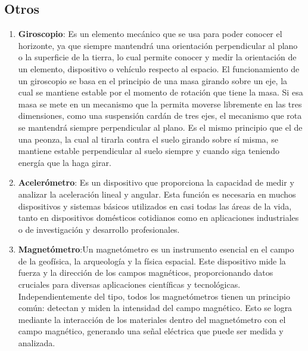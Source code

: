 	\subsection{Otros}
		\begin{enumerate}
		\item \textbf{Giroscopio}: Es un elemento mecánico que se usa para poder conocer el horizonte, ya que siempre mantendrá una orientación perpendicular al plano o la superficie de la tierra, lo cual permite conocer y medir la orientación de un elemento, dispositivo o vehículo respecto al espacio.
		El funcionamiento de un giroscopio se basa en el principio de una masa girando sobre un eje, la cual se mantiene estable por el momento de rotación que tiene la masa. Si esa masa se mete en un mecanismo que la permita moverse libremente en las tres dimensiones, como una suspensión cardán de tres ejes, el mecanismo que rota se mantendrá siempre perpendicular al plano. Es el mismo principio que el de una peonza, la cual al tirarla contra el suelo girando sobre sí misma, se mantiene estable perpendicular al suelo siempre y cuando siga teniendo energía que la haga girar. \cite{Giroscopio}
		
		\begin{figure}[h]
			\centering
			\hfill
		\end{figure}	
		
		\item \textbf{Acelerómetro}: Es un dispositivo que proporciona la capacidad de medir y analizar la aceleración lineal y angular. Esta función es necesaria en muchos dispositivos y sistemas básicos utilizados en casi todas las áreas de la vida, tanto en dispositivos domésticos cotidianos como en aplicaciones industriales o de investigación y desarrollo profesionales. \cite{Acelerómetro}
		
		\begin{figure}[h]
			\centering
			\hfill
		\end{figure}	
			
		\item \textbf{Magnetómetro}:Un magnetómetro es un instrumento esencial en el campo de la geofísica, la arqueología y la física espacial. Este dispositivo mide la fuerza y la dirección de los campos magnéticos, proporcionando datos cruciales para diversas aplicaciones científicas y tecnológicas.
		Independientemente del tipo, todos los magnetómetros tienen un principio común: detectan y miden la intensidad del campo magnético. Esto se logra mediante la interacción de los materiales dentro del magnetómetro con el campo magnético, generando una señal eléctrica que puede ser medida y analizada. \cite{Magnetómetro}
		

\end{enumerate}
